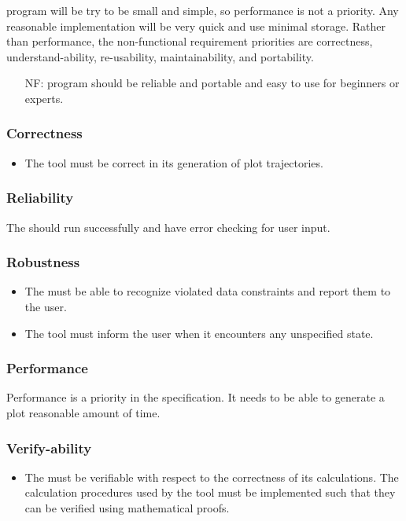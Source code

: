 \documentclass[12pt]{article}
\newcounter{reqnum} %
\newcounter{nfreqnum} %
\begin{document}
\progname program will be try to be small and simple, so performance is not a 
priority. Any reasonable implementation will be very quick and use minimal 
storage. Rather than performance, the non-functional requirement priorities 
are correctness, understand-ability, re-usability, maintainability, and 
portability. 

\begin{itemize}
\item[NF\refstepcounter{nfreqnum}\thenfreqnum:] \progname program should be 
reliable and portable and easy to use for beginners or experts.
\end{itemize}

\subsubsection*{Correctness}
\begin{itemize}
\item The \progname tool must be correct in its generation 
of plot trajectories.
\end{itemize}

\subsubsection*{Reliability}

The \progname should run successfully and have error checking for user input.

\subsubsection*{Robustness}
\begin{itemize}
	\item The \progname must be able to recognize violated data 
	constraints and report them to the user.
	\item The \progname tool must inform the user when it encounters any 
	unspecified state.
\end{itemize}

\subsubsection*{Performance}
Performance is a priority in the \progname specification. 
It needs to be able to generate a plot reasonable amount of time.

\subsubsection*{Verify-ability}
\begin{itemize}
	\item The \progname must be verifiable with respect to the 
	correctness of its calculations. The calculation 
	procedures used by the \progname tool must be implemented such that 
	they can be verified using mathematical proofs.
\end{itemize}
\end{document}

